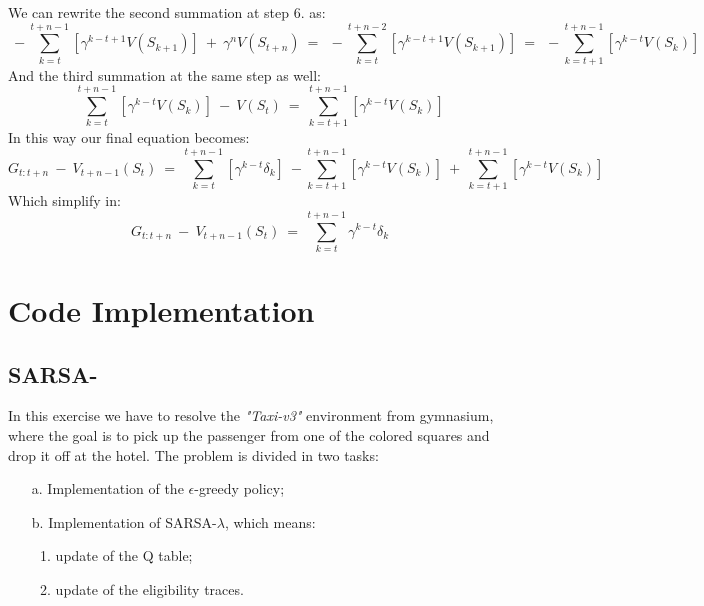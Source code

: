\documentclass[10pt,a4paper]{article}
\begin{document}
\noindent We can rewrite the second summation at step 6. as: 
\begin{equation*}
    \:-\sum_{k=t}^{t+n-1} [\gamma^{k-t+1} V(S_{k+1})] \:+\: \gamma^{n}V(S_{t+n}) \:=\: \:-\sum_{k=t}^{t+n-2} [\gamma^{k-t+1} V(S_{k+1})] \:=\: \:-\sum_{k=t+1}^{t+n-1} [\gamma^{k-t}V(S_k)]
\end{equation*}
\vspace{5pt}
And the third summation at the same step as well:
\begin{equation*}
    \sum_{k=t}^{t+n-1} [\gamma^{k-t}V(S_k)] \:-\: V(S_t) \:=\: \sum_{k=t+1}^{t+n-1} [\gamma^{k-t}V(S_k)]
\end{equation*}
\vspace{5pt}
In this way our final equation becomes:
\begin{equation*}
    G_{t:t+n} \:-\: V_{t+n-1}(S_t) \:=\: \sum_{k=t}^{t+n-1} [\gamma^{k-t}\delta_k] \:-\sum_{k=t+1}^{t+n-1} [\gamma^{k-t}V(S_k)] \:+\: \sum_{k=t+1}^{t+n-1} [\gamma^{k-t}V(S_k)]
\end{equation*}
\vspace{5pt}
Which simplify in:
\begin{equation*}
    G_{t:t+n} \:-\: V_{t+n-1}(S_t) \:=\: \sum_{k=t}^{t+n-1} \gamma^{k-t}\delta_k
\end{equation*}

\newpage
\section{Code Implementation}

\subsection{SARSA-\textlambda{}}
In this exercise we have to resolve the \textit{"Taxi-v3"} environment from gymnasium, where the goal is to pick up the passenger from one of the colored squares and drop it off at the hotel. The problem is divided in two tasks:
\begin{itemize}
    \item[a.] Implementation of the $\epsilon$-greedy policy;
    \item[b.] Implementation of SARSA-$\lambda$, which means:
    \begin{enumerate}
        \item update of the Q table;
        \item update of the eligibility traces.
    \end{enumerate}
\end{itemize}
\vspace{5pt}
\end{document}
